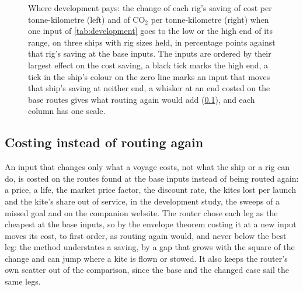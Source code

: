 
\begin{figure}[tbp]
\centering
{}
\caption{ Where development pays: the change of each rig's saving of cost per tonne-kilometre (left) and of CO$_2$ per tonne-kilometre (right) when one input of \cref{tab:development} goes to the low or the high end of its range, on three ships with rig sizes held, in percentage points against that rig's saving at the base inputs. The inputs are ordered by their largest effect on the cost saving, a black tick marks the high end, a tick in the ship's colour on the zero line marks an input that moves that ship's saving at neither end, a whisker at an end costed on the base routes gives what routing again would add (\cref{sec:recosting}), and each column has one scale.}
\label{fig:sensitivity}
\end{figure}

\subsection{Costing instead of routing again}
\label{sec:recosting}

An input that changes only what a voyage costs, not what the ship or a rig can do, is costed on the routes found at the base inputs instead of being routed again: a price, a life, the market price factor, the discount rate, the kites lost per launch and the kite's share out of service, in the development study, the sweeps of a missed goal and on the companion website. The router chose each leg as the cheapest at the base inputs, so by the envelope theorem costing it at a new input moves its cost, to first order, as routing again would, and never below the best leg: the method understates a saving, by a gap that grows with the square of the change and can jump where a kite is flown or stowed. It also keeps the router's own scatter out of the comparison, since the base and the changed case sail the same legs. 

